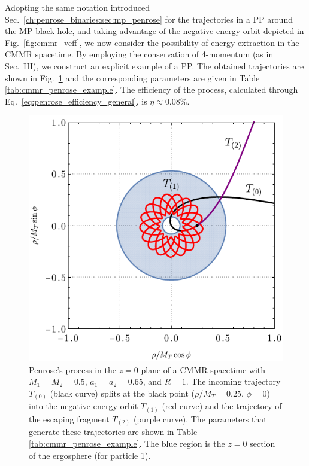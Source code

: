 Adopting the same notation introduced Sec.~\ref{ch:penrose_binaries:sec:mp_penrose} for the trajectories in a PP around the MP black hole, and taking advantage of the negative energy orbit depicted in Fig.~\ref{fig:cmmr_veff}, we now consider the possibility of energy extraction in the CMMR spacetime. By employing the conservation of 4-momentum (as in Sec.~III), we construct an explicit example of a PP. The obtained trajectories are shown in Fig.~\ref{fig:cmmr_penrose} and the corresponding parameters are given in Table \ref{tab:cmmr_penrose_example}. The efficiency of the process, calculated through Eq.~\eqref{eq:penrose_efficiency_general}, is $\eta \approx 0.08 \%$.

\begin{figure}[!ht]
  \centering
  \includegraphics[scale=0.8]{img/penrose_binaries/fig14.pdf}
  \caption{Penrose's process in the $z=0$ plane of a CMMR spacetime with $M_1=M_2=0.5$, $a_1=a_2=0.65$, and $R=1$. The incoming trajectory $T_{(0)}$ (black curve) splits at the black point ($\rho/M_T=0.25$, $\phi=0$) into the negative energy orbit $T_{(1)}$ (red curve) and the trajectory of the escaping fragment $T_{(2)}$ (purple curve). The parameters that generate these trajectories are shown in Table \ref{tab:cmmr_penrose_example}. The blue region is the $z=0$ section of the ergosphere (for particle 1).}
  \label{fig:cmmr_penrose}
\end{figure}

